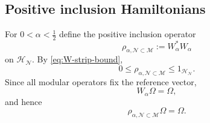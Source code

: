 \documentclass[a4paper,11pt]{article}
\theoremstyle{definition}
\newcommand{\mN}{\mathcal{N}}
\newcommand{\mH}{\mathcal{H}}
\newcommand{\mM}{\mathcal{M}}
\begin{document}


\subsection{Positive inclusion Hamiltonians}

For $0<\alpha<\frac12$ define the positive inclusion operator
\begin{equation}
    \boxed{
    \rho_{\alpha,\mN\subset\mM}
    :=
    W_\alpha^*W_\alpha
    }
    \label{eq:rho-alpha-general}
\end{equation}
on $\mH_{\mN}$. By \eqref{eq:W-strip-bound},
\begin{equation}
    0\leq
    \rho_{\alpha,\mN\subset\mM}
    \leq
    1_{\mH_{\mN}}.
    \label{eq:rho-alpha-contraction}
\end{equation}
Since all modular operators fix the reference vector,
\begin{equation}
    W_\alpha\Omega=\Omega,
\end{equation}
and hence
\begin{equation}
    \boxed{
    \rho_{\alpha,\mN\subset\mM}\Omega=\Omega .
    }
    \label{eq:rho-alpha-vacuum}
\end{equation}
\end{document}
